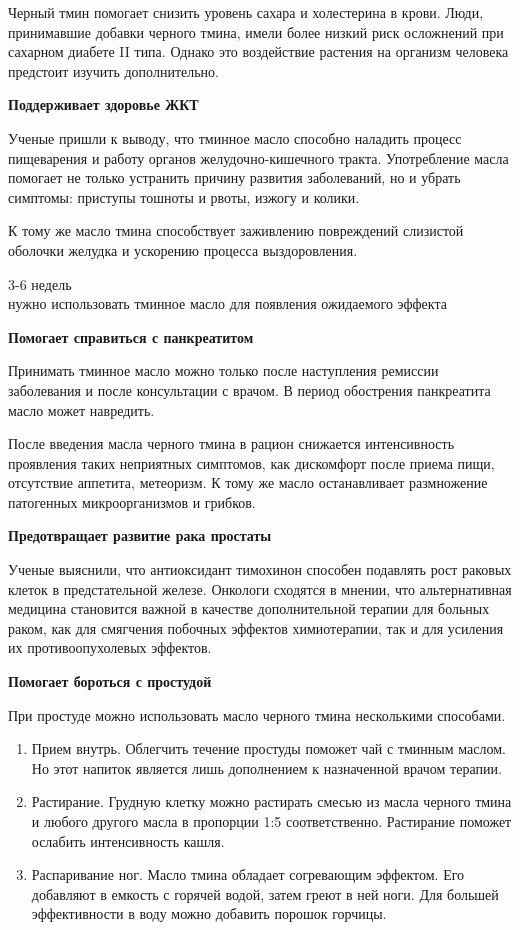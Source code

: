 Черный тмин помогает снизить уровень сахара и холестерина в крови. Люди, принимавшие добавки черного тмина, имели более низкий риск осложнений при сахарном диабете II типа. Однако это воздействие растения на организм человека предстоит изучить дополнительно.

\textbf{Поддерживает здоровье ЖКТ}

Ученые пришли к выводу, что тминное масло способно наладить процесс пищеварения и работу органов желудочно-кишечного тракта. Употребление масла помогает не только устранить причину развития заболеваний, но и убрать симптомы: приступы тошноты и рвоты, изжогу и колики.

К тому же масло тмина способствует заживлению повреждений слизистой оболочки желудка и ускорению процесса выздоровления.

\begin{fancyquotes}
    {\Huge 3-6 недель}\\

    нужно использовать тминное масло для появления ожидаемого эффекта
\end{fancyquotes}

\textbf{Помогает справиться с панкреатитом}

Принимать тминное масло можно только после наступления ремиссии заболевания и после консультации с врачом. В период обострения панкреатита масло может навредить.

После введения масла черного тмина в рацион снижается интенсивность проявления таких неприятных симптомов, как дискомфорт после приема пищи, отсутствие аппетита, метеоризм. К тому же масло останавливает размножение патогенных микроорганизмов и грибков.

\textbf{Предотвращает развитие рака простаты}

Ученые выяснили, что антиоксидант тимохинон способен подавлять рост раковых клеток в предстательной железе. Онкологи сходятся в мнении, что альтернативная медицина становится важной в качестве дополнительной терапии для больных раком, как для смягчения побочных эффектов химиотерапии, так и для усиления их противоопухолевых эффектов.

\textbf{Помогает бороться с простудой}

При простуде можно использовать масло черного тмина несколькими способами.

\begin{enumerate}
    \item Прием внутрь. Облегчить течение простуды поможет чай с тминным маслом. Но этот напиток является лишь дополнением к назначенной врачом терапии.
    \item Растирание. Грудную клетку можно растирать смесью из масла черного тмина и любого другого масла в пропорции 1:5 соответственно. Растирание поможет ослабить интенсивность кашля.
    \item Распаривание ног. Масло тмина обладает согревающим эффектом. Его добавляют в емкость с горячей водой, затем греют в ней ноги. Для большей эффективности в воду можно добавить порошок горчицы.
\end{enumerate}

